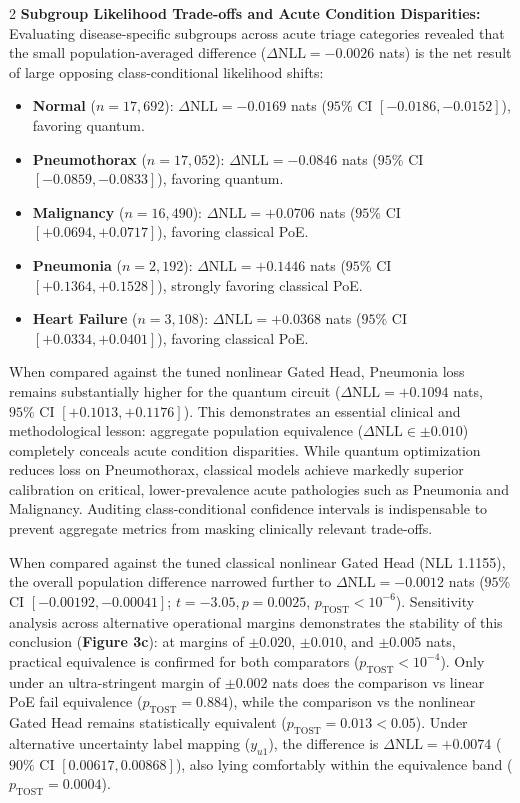 \documentclass[10pt,a4paper,twoside]{article}
\begin{document}
\begin{multicols}{2}
\noindent\textbf{Subgroup Likelihood Trade-offs and Acute Condition Disparities:} Evaluating disease-specific subgroups across acute triage categories revealed that the small population-averaged difference ($\Delta\text{NLL} = -0.0026$ nats) is the net result of large opposing class-conditional likelihood shifts:
\begin{itemize}
  \item \textbf{Normal} ($n = 17,692$): $\Delta\text{NLL} = \mathbf{-0.0169}$ nats ($95\%$ CI $[-0.0186, -0.0152]$), favoring quantum.
  \item \textbf{Pneumothorax} ($n = 17,052$): $\Delta\text{NLL} = \mathbf{-0.0846}$ nats ($95\%$ CI $[-0.0859, -0.0833]$), favoring quantum.
  \item \textbf{Malignancy} ($n = 16,490$): $\Delta\text{NLL} = \mathbf{+0.0706}$ nats ($95\%$ CI $[+0.0694, +0.0717]$), favoring classical PoE.
  \item \textbf{Pneumonia} ($n = 2,192$): $\Delta\text{NLL} = \mathbf{+0.1446}$ nats ($95\%$ CI $[+0.1364, +0.1528]$), strongly favoring classical PoE.
  \item \textbf{Heart Failure} ($n = 3,108$): $\Delta\text{NLL} = \mathbf{+0.0368}$ nats ($95\%$ CI $[+0.0334, +0.0401]$), favoring classical PoE.
\end{itemize}
When compared against the tuned nonlinear Gated Head, Pneumonia loss remains substantially higher for the quantum circuit ($\Delta\text{NLL} = \mathbf{+0.1094}$ nats, $95\%$ CI $[+0.1013, +0.1176]$). This demonstrates an essential clinical and methodological lesson: aggregate population equivalence ($\Delta\text{NLL} \in \pm 0.010$) completely conceals acute condition disparities. While quantum optimization reduces loss on Pneumothorax, classical models achieve markedly superior calibration on critical, lower-prevalence acute pathologies such as Pneumonia and Malignancy. Auditing class-conditional confidence intervals is indispensable to prevent aggregate metrics from masking clinically relevant trade-offs.

When compared against the tuned classical nonlinear Gated Head (NLL 1.1155), the overall population difference narrowed further to $\Delta\text{NLL} = \mathbf{-0.0012}$ nats ($95\%$ CI $[-0.00192, -0.00041]$; $t = -3.05, p = 0.0025$, $p_{\text{TOST}} < 10^{-6}$). Sensitivity analysis across alternative operational margins demonstrates the stability of this conclusion (\textbf{Figure 3c}): at margins of $\pm 0.020$, $\pm 0.010$, and $\pm 0.005$ nats, practical equivalence is confirmed for both comparators ($p_{\text{TOST}} < 10^{-4}$). Only under an ultra-stringent margin of $\pm 0.002$ nats does the comparison vs linear PoE fail equivalence ($p_{\text{TOST}} = 0.884$), while the comparison vs the nonlinear Gated Head remains statistically equivalent ($p_{\text{TOST}} = 0.013 < 0.05$). Under alternative uncertainty label mapping ($y_{u1}$), the difference is $\Delta\text{NLL} = +0.0074$ ($90\%$ CI $[0.00617, 0.00868]$), also lying comfortably within the equivalence band ($p_{\text{TOST}} = 0.0004$).

\end{multicols}
\end{document}

